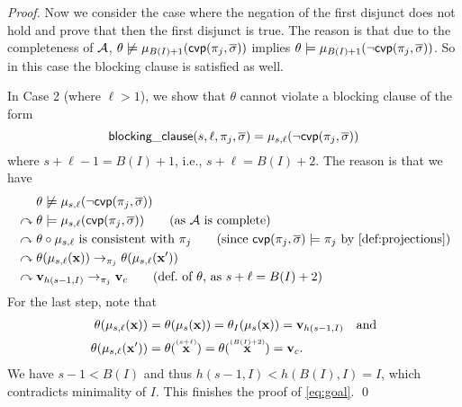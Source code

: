 {\begin{proof}
    Now we consider the case where the negation of the first disjunct does not hold and prove that then the first disjunct is true.
    The reason is that due to the completeness of $\AA$, $\theta \centernot\models \mu_{B(I)+1}(\mbip(\pi_j, \overline{\sigma}))$ implies $\theta \models \mu_{B(I)+1}(\neg\mbip(\pi_j, \overline{\sigma}))$.
    So in this case the blocking clause is satisfied as well.

    In Case 2 (where $\ell > 1$), we show that $\theta$ cannot violate a blocking clause of the form
    \[
      \blockingclause(s,\ell,\pi_j,\overline{\sigma}) = \mu_{s,\ell}(\neg\mbip(\pi_j, \overline{\sigma}))
    \]
    where $s + \ell - 1 = B(I)+1$, i.e., $s + \ell = B(I) + 2$.
    The reason is that we have
    \begin{align*}
                             & \theta \centernot\models \mu_{s,\ell}(\neg\mbip(\pi_j, \overline{\sigma}))                                                                       \\
      {} \curvearrowright {} & \theta \models \mu_{s,\ell}(\mbip(\pi_j, \overline{\sigma})) \tag{as $\AA$ is complete} \\
      {} \curvearrowright {} & \theta \circ \mu_{s,\ell} \text{ is consistent with } \pi_j \tag{since $\mbip(\pi_j,\overline{\sigma}) \models \pi_j$ by \Cref{def:projections}} \\
      {} \curvearrowright {} & \theta(\mu_{s,\ell}(\vec{x})) \to_{\pi_j} \theta(\mu_{s,\ell}(\vec{x}'))                                                              \\
      {} \curvearrowright {} & \vec{v}_{h(s-1,I)} \to_{\pi_j} \vec{v}_{c} \tag{def.\ of $\theta$, as $s+\ell = B(I)+2$}
    \end{align*}
    For the last step, note that
    \begin{align*}
      \theta(\mu_{s,\ell}(\vec{x})) & {} = \theta(\mu_{s}(\vec{x})) = \theta_I(\mu_{s}(\vec{x})) = \vec{v}_{h(s-1,I)} & \text{and} \\
      \theta(\mu_{s,\ell}(\vec{x}')) & {} = \theta(\ind{\vec{x}}{s + \ell}) = \theta(\ind{\vec{x}}{B(I)+2}) = \vec{v}_{c}.
    \end{align*}
    We have $s - 1 < B(I)$ and thus $h(s-1,I) < h(B(I),I) = I$, which contradicts minimality of $I$.
    This finishes the proof of \eqref{eq:goal}.
    \qed
  \end{proof}
}

